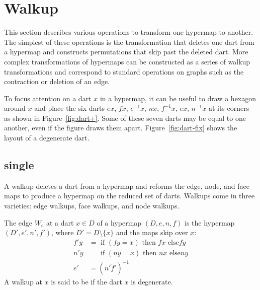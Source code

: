 \section{Walkup}

This section describes various operations to transform one hypermap to
another.  The simplest of these operations is the 
transformation that deletes one dart from a hypermap and constructs
permutations that skip past the deleted dart.  More complex
transformations of hypermaps can be constructed as a series of walkup
transformations and correspond to standard operations on graphs such as the
contraction or deletion of an edge.

To focus attention on a dart $x$ in a hypermap, it can be useful to draw a
hexagon around $x$ and place the six darts $e x$, $f x$, $e^{-1} x$,
$n x$, $f^{-1} x$, $e x$, $n^{-1} x$ at its corners as shown in
Figure~\ref{fig:dart+}.  Some of these seven darts may be equal to one
another, even if the figure draws them apart.
Figure~\ref{fig:dart-fix} shows the layout of a degenerate dart.
%

\figLMGQYKG %

\figANDKKER %


\subsection{single}

A walkup deletes a dart from a hypermap and reforms the edge, node,
and face maps to produce a hypermap on the reduced set of darts.
Walkups come in three varieties: edge walkups, face walkups, and node
walkups.

\begin{definition}
The edge 
$W_e$ at  a dart $x\in D$ of a hypermap $(D,e,n,f)$ is the hypermap
$(D',e',n',f')$, where $D' = D\setminus\{x\}$ and the maps skip over $x$:
\begin{align*}
f' y &= \text{ if } (f y =  x) \text{ then } f x \text{ else
} f y\\
n' y &= \text{ if } (n y = x) \text{ then } n x \text{ else
} n y\\
e' &= (n'\ocirc f')^{-1}
\end{align*}
A walkup at $x$ is said to be  if the dart $x$ is
degenerate.  
%
%
%
%
%
\end{definition}

